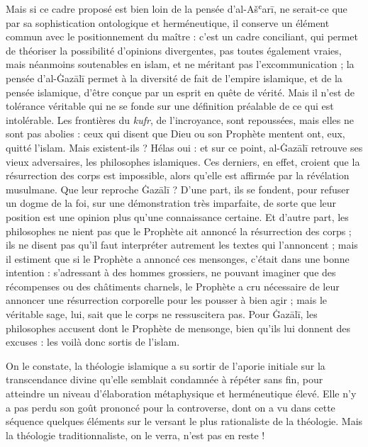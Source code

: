 Mais si ce cadre proposé est bien loin de la pensée d'al-Ašʿarī, ne
serait-ce que par sa sophistication ontologique et herméneutique, il
conserve un élément commun avec le
positionnement du maître : c'est un cadre conciliant, qui permet de
théoriser la possibilité d'opinions divergentes, pas toutes également
vraies, mais néanmoins soutenables en islam, et ne méritant pas
l'excommunication ; la pensée d'al-Ġazālī permet à la diversité de fait
de l'empire islamique, et de la pensée islamique, d'être conçue par un
esprit en quête de vérité. Mais il n'est de tolérance véritable qui ne
se fonde sur une définition préalable de ce qui est intolérable. Les
frontières du \emph{kufr}, de l'incroyance, sont repoussées, mais elles
ne sont pas abolies : ceux qui disent que Dieu ou son Prophète mentent
ont, eux, quitté l'islam. Mais existent-ils ? Hélas oui : et sur ce
point, al-Ġazālī retrouve ses vieux adversaires, les philosophes
islamiques. Ces derniers, en effet, croient que la résurrection des
corps est impossible, alors qu'elle est affirmée par la révélation
musulmane. Que leur reproche Ġazālī ? D'une part, ils se fondent, pour
refuser un dogme de la foi, sur une démonstration très imparfaite, de
sorte que leur position est une opinion plus qu'une connaissance
certaine. Et d'autre part, les philosophes ne nient pas que le Prophète
ait annoncé la résurrection des corps ; ils ne disent pas qu'il faut
interpréter autrement les textes qui l'annoncent ; mais il estiment que
si le Prophète a annoncé ces mensonges, c'était dans une bonne intention
: s'adressant à des hommes grossiers, ne pouvant imaginer que des
récompenses ou des châtiments charnels, le Prophète a cru nécessaire de
leur annoncer une résurrection corporelle pour les pousser à bien agir ;
mais le véritable sage, lui, sait que le corps ne ressuscitera pas. Pour
Ġazālī, les philosophes accusent dont le Prophète de mensonge, bien
qu'ils lui donnent des excuses : les voilà donc sortis de l'islam.

On le constate, la théologie islamique a su sortir de l'aporie initiale
sur la transcendance divine qu'elle semblait condamnée à répéter sans
fin, pour atteindre un niveau d'élaboration métaphysique et
herméneutique élevé. Elle n'y a pas perdu son goût prononcé pour la
controverse, dont on a vu dans cette séquence quelques éléments sur le
versant le plus rationaliste de la théologie. Mais la théologie
traditionnaliste, on le verra, n'est pas en reste !

